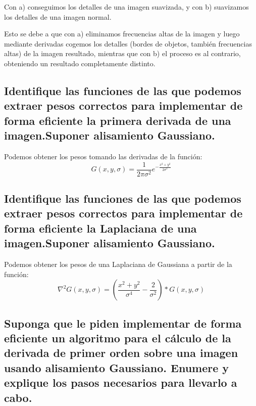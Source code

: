 \documentclass[11pt]{scrartcl} %
\begin{document}
Con a) conseguimos los detalles de una imagen suavizada, y con b) suavizamos
los detalles de una imagen normal.\newline

Esto se debe a que con a) eliminamos frecuencias altas de la imagen y luego 
mediante derivadas cogemos los detalles (bordes de objetos, también frecuencias altas) 
de la imagen resultado,
mientras que con b) el proceso es al contrario, obteniendo un resultado 
completamente distinto.

\subsection{Identifique las funciones de las que podemos extraer pesos
correctos para implementar de forma eficiente la primera derivada de una
imagen.\newline Suponer alisamiento Gaussiano.}


Podemos obtener los pesos tomando las derivadas de la función:
\begin{equation}
	G(x, y, \sigma) = \frac{1}{2\pi\sigma^2} e^{-\frac{x^2+y^2}{2\sigma^2}}
\end{equation}

\subsection{Identifique las funciones de las que podemos extraer pesos correctos
para implementar de forma eficiente la Laplaciana de una imagen.\newline Suponer
alisamiento Gaussiano.}


Podemos obtener los pesos de una Laplaciana de Gaussiana a partir de la función:
\begin{equation}
	\nabla^2 G(x, y, \sigma) = 
	(\frac{x^2+y^2}{\sigma^4} - \frac{2}{\sigma^2}) * G(x, y, \sigma)
\end{equation}

\subsection{Suponga que le piden implementar de forma eficiente un algoritmo
para el cálculo de la derivada de primer orden sobre una imagen usando
alisamiento Gaussiano.\newline
Enumere y explique los pasos necesarios para llevarlo a cabo.}
\end{document}
